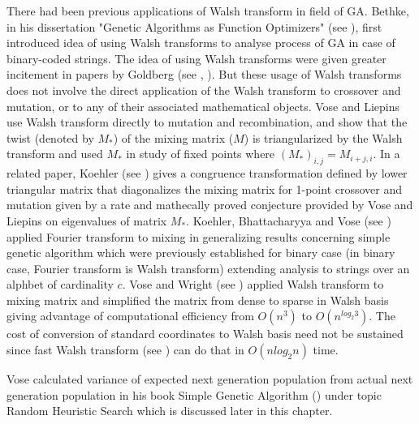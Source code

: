 There had been previous applications of Walsh transform in field of GA. Bethke, in his dissertation 
"Genetic Algorithms as Function Optimizers" (see \cite{Bethke1981}), first introduced 
idea of using Walsh transforms to analyse process of GA in case of binary-coded strings. The idea of using Walsh transforms 
were given greater incitement in papers by Goldberg (see \cite{Goldberg1989a}, \cite{Goldberg1989b}). But these usage of 
Walsh transforms does not involve the direct application of the Walsh transform to crossover and mutation, or to any of their 
associated mathematical objects. Vose and Liepins use Walsh transform directly to mutation and recombination, and show that the 
twist (denoted by $M_*$) of the mixing matrix ($M$) is triangularized by the Walsh transform and used $M_*$ in study of fixed points where $(M_*)_{i,j} = M_{i+j, i}$. In a related paper, Koehler (see \cite{Koehler1994}) gives a congruence 
transformation defined by lower triangular matrix that diagonalizes the mixing matrix for 1-point crossover and mutation given by a rate and mathecally proved conjecture provided by Vose and Liepins on eigenvalues of matrix $M_*$. Koehler, Bhattacharyya and Vose (see \cite{KoehlerBhatta1997}) applied Fourier transform to mixing in generalizing results concerning simple genetic algorithm which were previously established for binary case (in binary case, Fourier transform is Walsh transform) extending analysis to strings over an alphbet of cardinality $c$. Vose and Wright (see \cite{VoseWright1998}) applied Walsh transform to mixing matrix and simplified the matrix from dense to sparse in Walsh basis giving advantage of computational efficiency from $O(n^3)$ to $O(n^{log_2 3})$. The cost of conversion of standard coordinates to Walsh basis need not be sustained since fast Walsh transform (see \cite{Shanks1969}) can do that in $O(n log_2 n)$ time.

Vose calculated variance of expected next generation population from 
actual next generation population in his book Simple Genetic Algorithm (\cite{Vose1999}) under topic 
Random Heuristic Search which is discussed later in this chapter. 


